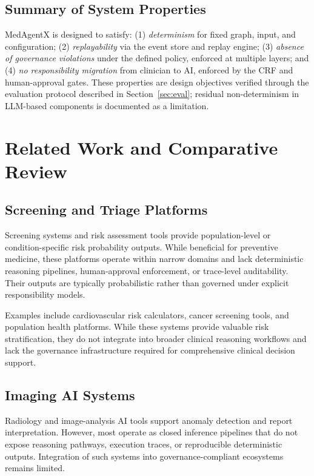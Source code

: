 \documentclass[journal]{IEEEtran}
\begin{document}
\subsection{Summary of System Properties}
MedAgentX is designed to satisfy: (1) \textit{determinism} for fixed graph, input, and configuration; (2) \textit{replayability} via the event store and replay engine; (3) \textit{absence of governance violations} under the defined policy, enforced at multiple layers; and (4) \textit{no responsibility migration} from clinician to AI, enforced by the CRF and human-approval gates. These properties are design objectives verified through the evaluation protocol described in Section~\ref{sec:eval}; residual non-determinism in LLM-based components is documented as a limitation.

\newpage
\section{Related Work and Comparative Review}
\label{sec:related}

\subsection{Screening and Triage Platforms}
Screening systems and risk assessment tools provide population-level or condition-specific risk probability outputs. While beneficial for preventive medicine, these platforms operate within narrow domains and lack deterministic reasoning pipelines, human-approval enforcement, or trace-level auditability. Their outputs are typically probabilistic rather than governed under explicit responsibility models.

Examples include cardiovascular risk calculators, cancer screening tools, and population health platforms. While these systems provide valuable risk stratification, they do not integrate into broader clinical reasoning workflows and lack the governance infrastructure required for comprehensive clinical decision support.

\subsection{Imaging AI Systems}
Radiology and image-analysis AI tools support anomaly detection and report interpretation. However, most operate as closed inference pipelines that do not expose reasoning pathways, execution traces, or reproducible deterministic outputs. Integration of such systems into governance-compliant ecosystems remains limited.
\end{document}
